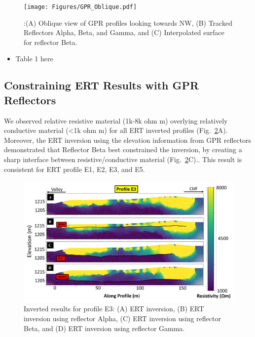 \documentclass[utf8]{frontiersSCNS}
\begin{document}
								 \begin{figure}[h]

	\texttt{[image: Figures/GPR\_Oblique.pdf]}
		\caption{:(A) Oblique view of GPR profiles looking towards NW, (B) Tracked Reflectors Alpha, Beta, and Gamma, and (C) Interpolated surface for reflector Beta. \label{GPR_Oblique}}

								   \end{figure}
								   
\begin{itemize}
    \item Table 1 here
\end{itemize}			   

								   
\subsection{Constraining ERT Results with GPR Reflectors}

We observed relative resistive material (1k-8k ohm m) overlying relatively conductive material (<1k ohm m) for all ERT inverted profiles (Fig.~\ref{ERT_inversion}A). Moreover, the ERT inversion using the elevation information from GPR reflectors demonstrated that Reflector Beta best constrained the inversion, by creating a sharp interface between resistive/conductive material (Fig.~\ref{ERT_inversion}C).. This result is consistent for ERT profile E1, E2, E3, and E5. 

							 \begin{figure}[h]

	\includegraphics[width=\textwidth]{Figures/ERT_inversion.pdf}
		\caption{Inverted results for profile E3: (A) ERT inversion, (B) ERT inversion using reflector Alpha, (C) ERT inversion using reflector Beta, and (D) ERT inversion using reflector Gamma.\label{ERT_inversion}}

								   \end{figure}
\end{document}
